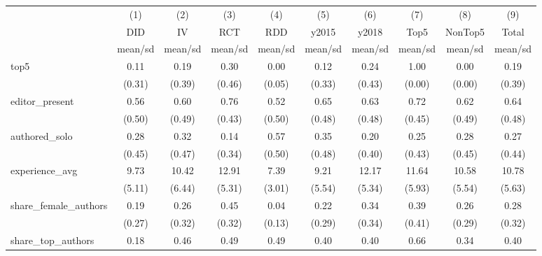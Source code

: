 {
\def\sym#1{\ifmmode^{#1}\else\(^{#1}\)\fi}
\begin{tabular}{l*{9}{c}}
\hline\hline
            &\multicolumn{1}{c}{(1)}&\multicolumn{1}{c}{(2)}&\multicolumn{1}{c}{(3)}&\multicolumn{1}{c}{(4)}&\multicolumn{1}{c}{(5)}&\multicolumn{1}{c}{(6)}&\multicolumn{1}{c}{(7)}&\multicolumn{1}{c}{(8)}&\multicolumn{1}{c}{(9)}\\
            &\multicolumn{1}{c}{DID}&\multicolumn{1}{c}{IV}&\multicolumn{1}{c}{RCT}&\multicolumn{1}{c}{RDD}&\multicolumn{1}{c}{y2015}&\multicolumn{1}{c}{y2018}&\multicolumn{1}{c}{Top5}&\multicolumn{1}{c}{NonTop5}&\multicolumn{1}{c}{Total}\\
            &     mean/sd&     mean/sd&     mean/sd&     mean/sd&     mean/sd&     mean/sd&     mean/sd&     mean/sd&     mean/sd\\
\hline
top5        &        0.11&        0.19&        0.30&        0.00&        0.12&        0.24&        1.00&        0.00&        0.19\\
            &      (0.31)&      (0.39)&      (0.46)&      (0.05)&      (0.33)&      (0.43)&      (0.00)&      (0.00)&      (0.39)\\
editor\_present&        0.56&        0.60&        0.76&        0.52&        0.65&        0.63&        0.72&        0.62&        0.64\\
            &      (0.50)&      (0.49)&      (0.43)&      (0.50)&      (0.48)&      (0.48)&      (0.45)&      (0.49)&      (0.48)\\
authored\_solo&        0.28&        0.32&        0.14&        0.57&        0.35&        0.20&        0.25&        0.28&        0.27\\
            &      (0.45)&      (0.47)&      (0.34)&      (0.50)&      (0.48)&      (0.40)&      (0.43)&      (0.45)&      (0.44)\\
experience\_avg&        9.73&       10.42&       12.91&        7.39&        9.21&       12.17&       11.64&       10.58&       10.78\\
            &      (5.11)&      (6.44)&      (5.31)&      (3.01)&      (5.54)&      (5.34)&      (5.93)&      (5.54)&      (5.63)\\
share\_female\_authors&        0.19&        0.26&        0.45&        0.04&        0.22&        0.34&        0.39&        0.26&        0.28\\
            &      (0.27)&      (0.32)&      (0.32)&      (0.13)&      (0.29)&      (0.34)&      (0.41)&      (0.29)&      (0.32)\\
share\_top\_authors&        0.18&        0.46&        0.49&        0.49&        0.40&        0.40&        0.66&        0.34&        0.40\\

\end{tabular}}
